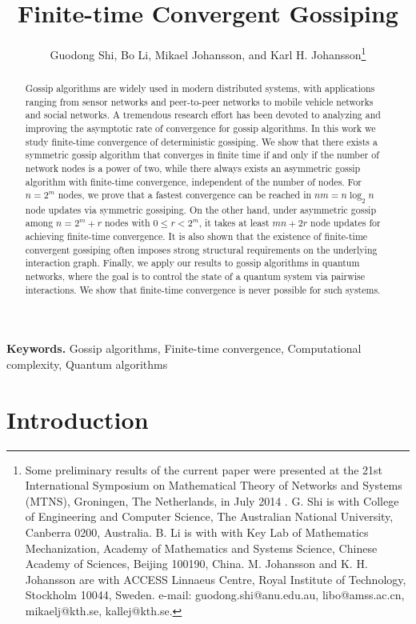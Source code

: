 \documentclass[a4paper, 11pt]{article}
\title{\bf Finite-time Convergent Gossiping}
\date{}
\author{Guodong Shi, Bo Li, Mikael  Johansson,  and Karl H. Johansson\thanks{Some preliminary results of the current paper were presented at the  21st International Symposium on Mathematical Theory of Networks and Systems (MTNS), Groningen, The Netherlands, in July 2014 \cite{MTNS}. G. Shi is with College of Engineering and Computer Science, The Australian National University, Canberra 0200, Australia. B. Li is with with Key Lab of Mathematics Mechanization, Academy of Mathematics and Systems Science, Chinese Academy of Sciences, Beijing 100190, China.   M.  Johansson and K. H. Johansson are with ACCESS Linnaeus Centre, Royal Institute of Technology, Stockholm 10044, Sweden. e-mail: guodong.shi@anu.edu.au, libo@amss.ac.cn, mikaelj@kth.se,  kallej@kth.se. }}
\begin{document}
\maketitle

\begin{abstract}
Gossip algorithms are widely used in modern distributed systems, with applications ranging from sensor networks and peer-to-peer networks to mobile vehicle networks and social networks. A tremendous research effort has been devoted to analyzing and improving the asymptotic rate of convergence for gossip algorithms. In this work we study finite-time convergence of deterministic gossiping. We show that there exists a symmetric gossip algorithm that converges in finite time if and only if the number of network nodes is a power of two, while there always exists an asymmetric gossip algorithm with  finite-time convergence, independent of the number of nodes. For $n=2^m$ nodes, we prove that a fastest convergence can be reached in $nm=n\log_2 n$ node updates via symmetric gossiping. On the other hand, under asymmetric gossip among $n=2^m+r$ nodes with $0\leq r<2^m$, it takes at least $mn+2r$ node updates for achieving finite-time convergence. It is also shown that the existence of  finite-time convergent gossiping often imposes strong structural requirements on the underlying interaction graph. Finally, we apply our results to gossip algorithms in quantum networks, where the goal is to control the state of a quantum system via pairwise interactions. We show that finite-time convergence is never possible for such systems.
\end{abstract}


{\bf Keywords.} Gossip algorithms, Finite-time convergence, Computational complexity, Quantum algorithms




\section{Introduction}\label{Sec:Introduction}
\end{document}
